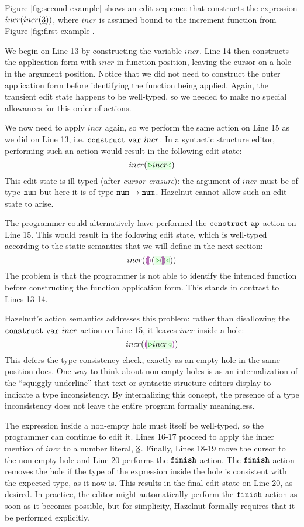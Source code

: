 Figure \ref{fig:second-example} shows an edit sequence that constructs the
expression $incr(incr(\underline{3}))$, where $incr$ is assumed bound to the
increment function from Figure \ref{fig:first-example}.

We begin on Line 13 by constructing the variable $incr$. Line 14 then
constructs the application form with $incr$ in function position, leaving
the cursor on a hole in the argument position. Notice that we did not need
to construct the outer application form before identifying the function
being applied. Again, the transient edit state happens to be well-typed, so
we needed to make no special allowances for this order of actions.

We now need to apply $incr$ again, so we perform the same action on Line 15
as we did on Line 13, i.e. $\mathtt{construct}~\mathtt{var}~incr$. In a syntactic
structure editor, performing such an action would result in the following
edit state:
\[
incr(\zwsel{incr})
\]
This edit state is ill-typed (after \emph{cursor erasure}): the argument of
$incr$ must be of type $\texttt{num}$ but here it is of type
$\texttt{num} \rightarrow \texttt{num}$. Hazelnut cannot allow such an edit state to arise.

The programmer could alternatively have performed the $\mathtt{construct}~\mathtt{ap}$
action on Line 15. This would result in the following edit state, which is
well-typed according to the static semantics that we will define in the
next section:
\[
incr(\hhole{}(\zwsel{\hhole{}}))
\]
The problem is that the programmer is not able to identify the intended
function before constructing the function application form. This stands in
contrast to Lines 13-14.

Hazelnut's action semantics addresses this problem: rather than disallowing
the $\mathtt{construct}~\mathtt{var}~incr$ action on Line 15, it leaves $incr$ inside a
hole:
\[
incr(\hhole{\zwsel{incr}})
\]
This defers the type consistency check, exactly as an empty hole in the
same position does. One way to think about non-empty holes is as an
internalization of the ``squiggly underline'' that text or syntactic
structure editors display to indicate a type inconsistency. By
internalizing this concept, the presence of a type inconsistency does not
leave the entire program formally meaningless.

The expression inside a non-empty hole must itself be well-typed, so the
programmer can continue to edit it. Lines 16-17 proceed to apply the inner
mention of $incr$ to a number literal, $\underline{3}$. Finally, Lines 18-19
move the cursor to the non-empty hole and Line 20 performs the $\mathtt{finish}$
action. The $\mathtt{finish}$ action removes the hole if the type of the
expression inside the hole is consistent with the expected type, as it now
is. This results in the final edit state on Line 20, as desired. In
practice, the editor might automatically perform the $\mathtt{finish}$ action as
soon as it becomes possible, but for simplicity, Hazelnut formally requires
that it be performed explicitly.

